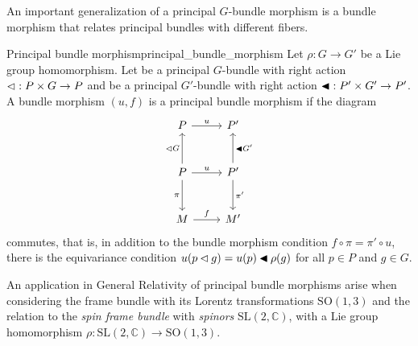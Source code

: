 An important generalization of a principal \(G\)-bundle morphism is a bundle morphism that relates principal bundles with different fibers.
\begin{definition}{Principal bundle morphism}{principal_bundle_morphism}
    Let \(\rho : G \to G'\) be a Lie group homomorphism. Let  be a principal \(G\)-bundle with right action \(\mathbin{\vartriangleleft} : P \times G \to P\) and  be a principal \(G'\)-bundle with right action \(\mathbin{\blacktriangleleft} : P' \times G' \to P'\). A bundle morphism \((u,f)\) is a principal bundle morphism if the diagram
    \begin{equation*}
        \begin{tikzcd}[column sep = normal, row sep = large]
            P \arrow{r}{u} & P'\\
            P \arrow[swap]{d}{\pi} \arrow{u}{\ract G} \arrow{r}{u} & P' \arrow[swap]{u}{\ractalt G'} \arrow{d}{\pi'}\\
            M \arrow{r}{f} & M'
        \end{tikzcd}
    \end{equation*}
    commutes, that is, in addition to the bundle morphism condition \(f \circ \pi = \pi' \circ u\), there is the equivariance condition \(u(p \mathbin{\vartriangleleft} g) = u(p) \mathbin{\blacktriangleleft} \rho(g)\) for all \(p \in P\) and \(g \in G\).
\end{definition}
\begin{remark}
    An application in General Relativity of principal bundle morphisms arise when considering the frame bundle with its Lorentz transformations \(\mathrm{SO}(1,3)\) and the relation to the \emph{spin frame bundle} with \emph{spinors} \(\mathrm{SL}(2,\mathbb{C})\), with a Lie group homomorphism \(\rho : \mathrm{SL}(2,\mathbb{C}) \to \mathrm{SO}(1,3)\).
\end{remark}


